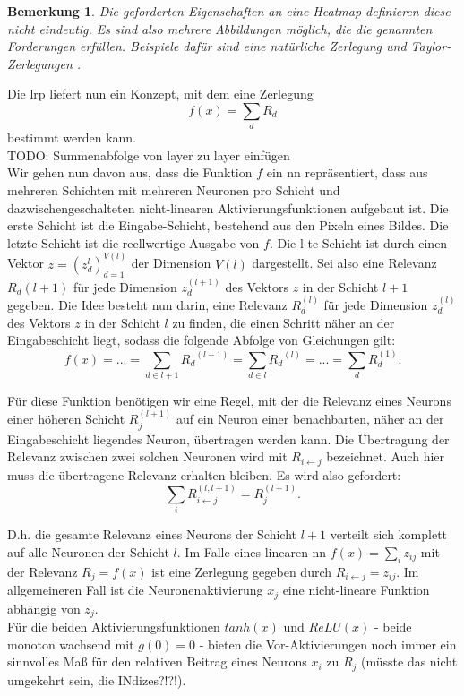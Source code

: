 \documentclass[twoside, 11pt,a4paper]{article}
\newtheorem{remark}[theorem]{Bemerkung}
\numberwithin{equation}{section}
\begin{document}
	\begin{remark}
		Die geforderten Eigenschaften an eine Heatmap definieren diese nicht eindeutig. Es sind also mehrere Abbildungen möglich, die die genannten Forderungen erfüllen. Beispiele dafür sind eine natürliche Zerlegung und Taylor-Zerlegungen \cite{dtd_paper}.
	\end{remark}
	
	Die \gls{lrp} liefert nun ein Konzept, mit dem eine Zerlegung 
	\begin{equation}
	f(x) = \sum_dR_d
	\end{equation}
	bestimmt werden kann.\\
	TODO: Summenabfolge von layer zu layer einfügen\\
	
	
	Wir gehen nun davon aus, dass die Funktion $f$ ein \gls{nn} repräsentiert, dass aus mehreren Schichten mit mehreren Neuronen pro Schicht und dazwischengeschalteten nicht-linearen Aktivierungsfunktionen aufgebaut ist.
	Die erste Schicht ist die Eingabe-Schicht, bestehend aus den Pixeln eines Bildes. Die letzte Schicht ist die reellwertige Ausgabe von $f$. Die l-te Schicht ist durch einen Vektor $z = (z_d^{l})_{d=1}^{V(l)}$ der Dimension $V(l)$ dargestellt. Sei also eine Relevanz $R_d{(l+1)}$ für jede Dimension $z_d^{(l+1)}$ des Vektors $z$ in der Schicht $l+1$ gegeben. Die Idee besteht nun darin, eine Relevanz $R_d^{(l)}$ für jede Dimension $z_d^{(l)}$ des Vektors $z$ in der Schicht $l$ zu finden, die einen Schritt näher an der Eingabeschicht liegt, sodass die folgende Abfolge von Gleichungen gilt:
	\begin{equation}
	f(x) = ... = \sum_{d\in l+1}{R_d}^{(l+1)} = \sum_{d\in l}{R_d}^{(l)} = ... = \sum_d{R_d^{(1)}}.\label{erhaltungseigenschaft}
	\end{equation}
	
	
	Für diese Funktion benötigen wir eine Regel, mit der die Relevanz eines Neurons einer höheren Schicht $R_j^{(l+1)}$ auf ein Neuron einer benachbarten, näher an der Eingabeschicht liegendes Neuron, übertragen werden kann.
	Die Übertragung der Relevanz zwischen zwei solchen Neuronen wird mit $R_{i\leftarrow j}$ bezeichnet. Auch hier muss die übertragene Relevanz erhalten bleiben. Es wird also gefordert:
	\begin{equation}
	\sum_i{R_{i\leftarrow j}^{(l,l+1)}} = R_j^{(l+1)}.
	\end{equation}
	
	D.h. die gesamte Relevanz eines Neurons der Schicht $l+1$ verteilt sich komplett auf alle Neuronen der Schicht $l$.
	Im Falle eines linearen \gls{nn} $f(x) = \sum_i{z_{ij}}$ mit der Relevanz $R_j = f(x)$ ist eine Zerlegung gegeben durch $R_{i\leftarrow j} = z_{ij}.$
	Im allgemeineren Fall ist die Neuronenaktivierung $x_j$ eine nicht-lineare Funktion abhängig von $z_j$.\\
	Für die beiden Aktivierungsfunktionen $tanh(x)$ und $ReLU(x)$ - beide monoton wachsend mit $g(0)=0$ - bieten die Vor-Aktivierungen noch immer ein sinnvolles Maß für den relativen Beitrag eines Neurons $x_i$ zu $R_j$ (müsste das nicht umgekehrt sein, die INdizes?!?!).
	
\end{document}
